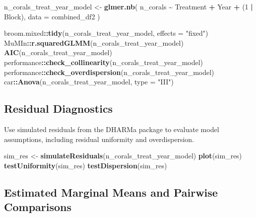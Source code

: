 \documentclass[
]{article}
\newenvironment{Shaded}{\begin{snugshade}}{\end{snugshade}}
\newcommand{\AttributeTok}[1]{\textcolor[rgb]{0.13,0.29,0.53}{#1}}
\newcommand{\DecValTok}[1]{\textcolor[rgb]{0.00,0.00,0.81}{#1}}
\newcommand{\FunctionTok}[1]{\textcolor[rgb]{0.13,0.29,0.53}{\textbf{#1}}}
\newcommand{\NormalTok}[1]{#1}
\newcommand{\OtherTok}[1]{\textcolor[rgb]{0.56,0.35,0.01}{#1}}
\newcommand{\SpecialCharTok}[1]{\textcolor[rgb]{0.81,0.36,0.00}{\textbf{#1}}}
\newcommand{\StringTok}[1]{\textcolor[rgb]{0.31,0.60,0.02}{#1}}
\begin{document}
\begin{Shaded}
\begin{Highlighting}[]
\NormalTok{n\_corals\_treat\_year\_model }\OtherTok{\textless{}{-}} \FunctionTok{glmer.nb}\NormalTok{(}
\NormalTok{  n\_corals }\SpecialCharTok{\textasciitilde{}}
\NormalTok{    Treatment }\SpecialCharTok{+}
\NormalTok{    Year }\SpecialCharTok{+}
\NormalTok{    (}\DecValTok{1} \SpecialCharTok{|}\NormalTok{ Block),}
  \AttributeTok{data =}\NormalTok{ combined\_df2}
\NormalTok{)}

\NormalTok{broom.mixed}\SpecialCharTok{::}\FunctionTok{tidy}\NormalTok{(n\_corals\_treat\_year\_model, }\AttributeTok{effects =} \StringTok{"fixed"}\NormalTok{)}
\NormalTok{MuMIn}\SpecialCharTok{::}\FunctionTok{r.squaredGLMM}\NormalTok{(n\_corals\_treat\_year\_model)}
\FunctionTok{AIC}\NormalTok{(n\_corals\_treat\_year\_model)}
\NormalTok{performance}\SpecialCharTok{::}\FunctionTok{check\_collinearity}\NormalTok{(n\_corals\_treat\_year\_model)}
\NormalTok{performance}\SpecialCharTok{::}\FunctionTok{check\_overdispersion}\NormalTok{(n\_corals\_treat\_year\_model)}
\NormalTok{car}\SpecialCharTok{::}\FunctionTok{Anova}\NormalTok{(n\_corals\_treat\_year\_model, }\AttributeTok{type =} \StringTok{"III"}\NormalTok{)}
\end{Highlighting}
\end{Shaded}

\subsection{Residual Diagnostics}\label{residual-diagnostics-1}

Use simulated residuals from the DHARMa package to evaluate model
assumptions, including residual uniformity and overdispersion.

\begin{Shaded}
\begin{Highlighting}[]
\NormalTok{sim\_res }\OtherTok{\textless{}{-}} \FunctionTok{simulateResiduals}\NormalTok{(n\_corals\_treat\_year\_model)}
\FunctionTok{plot}\NormalTok{(sim\_res)}
\FunctionTok{testUniformity}\NormalTok{(sim\_res)}
\FunctionTok{testDispersion}\NormalTok{(sim\_res)}
\end{Highlighting}
\end{Shaded}

\subsection{Estimated Marginal Means and Pairwise
Comparisons}\label{estimated-marginal-means-and-pairwise-comparisons-1}
\end{document}
